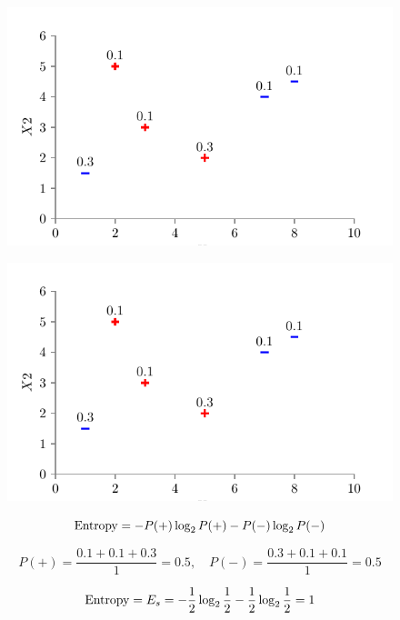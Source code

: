 \documentclass[usenames,dvipsnames]{beamer}
\begin{document}
	
	\begin{frame}
	
	\begin{figure}
		\centering
		\includegraphics{../assets/decision-trees/figures/dt_weighted/fig2.pdf}
	\end{figure}
	
	
	\end{frame}
	
	
	\begin{frame}
	
	\begin{figure}
		\centering
		\includegraphics{../assets/decision-trees/figures/dt_weighted/fig2.pdf}
	\end{figure}
	
	$$\operatorname{Entropy} = -P(+) \log_2 P(+) - P(-) \log_2 P(-)$$
	
	$$P(+) = \frac{0.1 + 0.1 + 0.3}{1} = 0.5, \quad P(-) = \frac{0.3 + 0.1 + 0.1}{1} = 0.5$$
	
	$$\operatorname{Entropy} = E_s = -\frac{1}{2} \log_2 \frac{1}{2} - \frac{1}{2} \log_2 \frac{1}{2} = 1$$
	
	\end{frame}
	
\end{document}
